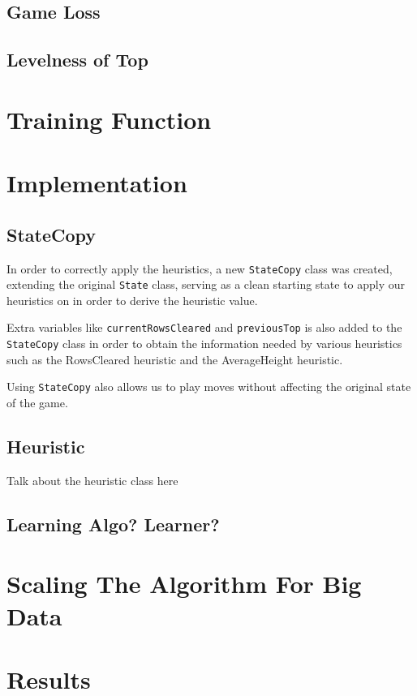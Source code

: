 \documentclass[12pt]{article}
\begin{document}
\subsection{Game Loss}

\subsection{Levelness of Top}

\section{Training Function}

\section{Implementation}
\subsection{StateCopy}
In order to correctly apply the heuristics, a new \texttt{StateCopy} class was created, extending the original \texttt{State} class, serving as a clean starting state to apply our heuristics on in order to derive the heuristic value. 

Extra variables like \texttt{currentRowsCleared} and \texttt{previousTop} is also added to the \texttt{StateCopy} class in order to obtain the information needed by various heuristics such as the RowsCleared heuristic and the AverageHeight heuristic.

Using \texttt{StateCopy} also allows us to play moves without affecting the original state of the game.

\subsection{Heuristic}
Talk about the heuristic class here

\subsection{Learning Algo? Learner?}

\section{Scaling The Algorithm For Big Data}

\section{Results}
\end{document}
